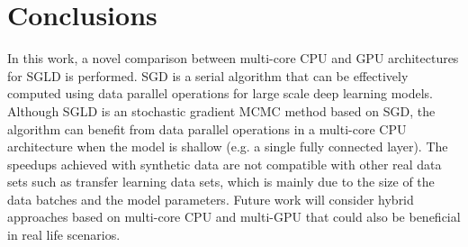 \documentclass[conference]{IEEEtran}
\begin{document}
\section{Conclusions}
In this work, a novel comparison between multi-core CPU and GPU architectures for SGLD is performed. SGD is a serial algorithm that can be effectively computed using data parallel operations for large scale deep learning models. Although SGLD is an stochastic gradient MCMC method based on SGD, the algorithm can benefit from data parallel operations in a multi-core CPU architecture when the model is shallow (e.g. a single fully connected layer).  The speedups achieved with synthetic data are not compatible with other real data sets such as transfer learning data sets, which is mainly due to the size of the data batches and the model parameters. Future work will consider hybrid approaches based on multi-core CPU and multi-GPU that could also be beneficial in real life scenarios. 


\end{document}
